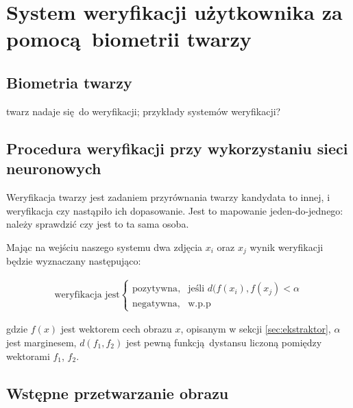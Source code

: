

\section[verification]{System weryfikacji użytkownika za pomocą biometrii twarzy}

\subsection{Biometria twarzy}

twarz nadaje się do weryfikacji; przykłady systemów weryfikacji?

\subsection{Procedura weryfikacji przy wykorzystaniu sieci neuronowych} 

Weryfikacja twarzy jest zadaniem przyrównania twarzy
kandydata to innej, i weryfikacja czy nastąpiło ich dopasowanie. Jest to mapowanie
jeden-do-jednego: należy sprawdzić czy jest to ta sama osoba.

Mając na wejściu naszego systemu dwa zdjęcia \(x_i\) oraz \(x_j\) wynik weryfikacji będzie wyznaczany następująco:

\begin{align}\label{eq:ekstraktor_weryfikacja}
\text{weryfikacja jest}\begin{cases}
    \text{pozytywna},& \text{jeśli } d(f(x_i), f(x_j) < \alpha \\
    \text{negatywna},              & \text{w.p.p}
\end{cases}
\end{align}

gdzie \(f(x)\) jest wektorem cech obrazu \(x\), opisanym w sekcji
\ref{sec:ekstraktor}, \(\alpha\) jest marginesem, \(d(f_1, f_2)\) jest pewną funkcją dystansu liczoną pomiędzy wektorami \(f_1\), \(f_2\).

\subsection{Wstępne przetwarzanie obrazu}

